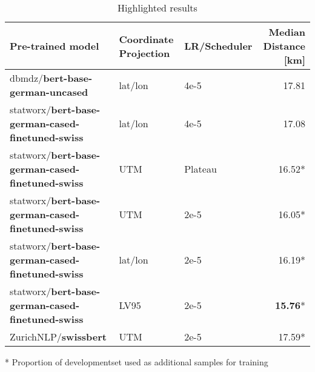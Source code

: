 \begin{table}
    \centering
    \begin{tabular}{p{}|p{}|p{}|r}
        \toprule
        Pre-trained model                                        & Coordinate Projection & LR/Scheduler & Median Distance [km] \\
        \midrule
        dbmdz/\textbf{bert-base-german-uncased}                  & lat/lon               & 4e-5         & 17.81                \\
        statworx/\textbf{bert-base-german-cased-finetuned-swiss} & lat/lon               & 4e-5         & 17.08                \\
        statworx/\textbf{bert-base-german-cased-finetuned-swiss} & UTM                   & Plateau      & 16.52*               \\
        statworx/\textbf{bert-base-german-cased-finetuned-swiss} & UTM                   & 2e-5         & 16.05*               \\
        statworx/\textbf{bert-base-german-cased-finetuned-swiss} & lat/lon               & 2e-5         & 16.19*               \\
        statworx/\textbf{bert-base-german-cased-finetuned-swiss} & LV95                  & 2e-5         & \textbf{15.76}*      \\
        ZurichNLP/\textbf{swissbert}                             & UTM                   & 2e-5         & 17.59*               \\
        \bottomrule
    \end{tabular}
    \caption{Highlighted results}
    \bigskip
    \raggedright
    * Proportion of developmentset used as additional samples for training \\
    \label{tbl:highlighted-results}
\end{table}

